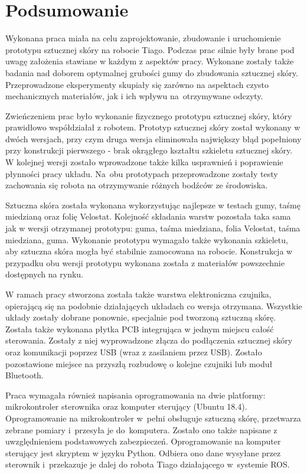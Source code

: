 \newpage
\section{Podsumowanie}
\label{s_podsumowanie}

Wykonana praca miała na celu zaprojektowanie, zbudowanie i uruchomienie prototypu sztucznej skóry na robocie Tiago. Podczas prac silnie były brane pod uwagę założenia stawiane w każdym z aspektów pracy. Wykonane zostały także badania nad doborem optymalnej grubości gumy do zbudowania sztucznej skóry. Przeprowadzone eksperymenty skupiały się zarówno na aspektach czysto mechanicznych materiałów, jak i ich wpływu na~otrzymywane odczyty.

Zwieńczeniem prac było wykonanie fizycznego prototypu sztucznej skóry, który prawidłowo współdziałał z robotem.
Prototyp sztucznej skóry został wykonany w dwóch wersjach, przy czym druga wersja eliminowała największy błąd popełniony przy konstrukcji pierwszego - brak okrągłego kształtu szkieletu sztucznej skóry. W kolejnej wersji zostało wprowadzone także kilka usprawnień i poprawienie płynności pracy układu. Na~obu prototypach przeprowadzone zostały testy zachowania się robota na otrzymywanie różnych bodźców ze środowiska.

Sztuczna skóra została wykonana wykorzystując najlepsze w testach gumy, taśmę miedzianą oraz folię Velostat. Kolejność składania warstw pozostała taka sama jak w wersji otrzymanej prototypu: guma, taśma miedziana, folia Velostat, taśma miedziana, guma.
Wykonanie prototypu wymagało także wykonania szkieletu, aby sztuczna skóra mogła być stabilnie zamocowana na robocie. Konstrukcja w przypadku obu wersji prototypu wykonana została z materiałów powszechnie dostępnych na rynku.

W ramach pracy stworzona została także warstwa elektroniczna czujnika, opierającą się na podobnie działających układach co wersja otrzymana. Wszystkie układy zostały dobrane ponownie, specjalnie pod tworzoną sztuczną skórę. Została także wykonana płytka PCB integrująca w jednym miejscu całość sterowania. Zostały z niej wyprowadzone złącza do podłączenia sztucznej skóry oraz komunikacji poprzez USB (wraz z zasilaniem przez USB). Zostało pozostawione miejsce na przyszłą rozbudowę o kolejne czujniki lub moduł Bluetooth.

Praca wymagała również napisania oprogramowania na dwie platformy: mikrokontroler sterownika oraz komputer sterujący (Ubuntu 18.4). Oprogramowanie na mikrokontroler w~pełni obsługuje sztuczną skórę, przetwarza zebrane pomiary i~przesyła je do~komputera. Zostało ono także napisane z uwzględnieniem podstawowych zabezpieczeń. Oprogramowanie na komputer sterujący jest skryptem w języku Python. Odbiera ono dane wysyłane przez sterownik i~przekazuje je dalej do robota Tiago działającego w~systemie ROS.

